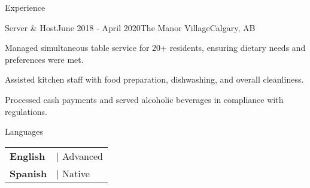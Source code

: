 \documentclass[
	11pt, %
]{resume} %
\begin{document}
\begin{rSection}{Experience}

	\begin{rSubsection}{Server \& Host}{June 2018 - April 2020}{The Manor Village}{Calgary, AB}
		\item Managed simultaneous table service for 20+ residents, ensuring dietary needs and preferences were met.
		\item Assisted kitchen staff with food preparation, dishwashing, and overall cleanliness.
		\item Processed cash payments and served alcoholic beverages in compliance with regulations.
	\end{rSubsection}

\end{rSection}


\begin{rSection}{Languages}

	\begin{tabular}{@{} >{\bfseries}l @{} l @{}}
		English &| Advanced\\
		Spanish &| Native\\
	\end{tabular}

\end{rSection}

\end{document}
